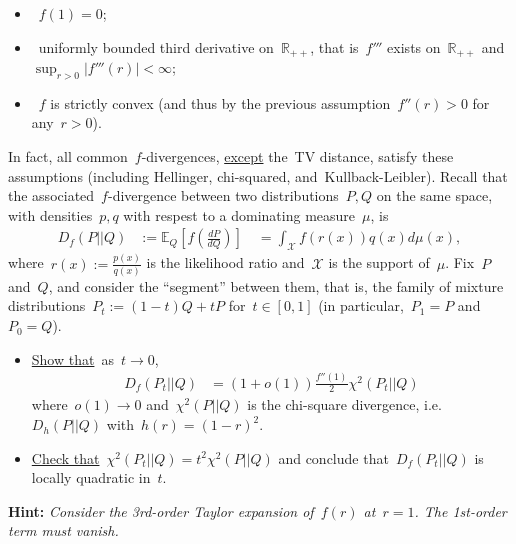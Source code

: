 \documentclass[11pt]{article}
\newcommand{\R}{\mathds{R}}
\newcommand{\E}{\mathds{E}}
\newcommand{\cX}{\mathcal{X}}
\begin{document}
\begin{itemize}
\item~$f(1) = 0$;
\item~uniformly bounded third derivative on~$\R_{++}$, that is~$f'''$ exists on~$\R_{++}$ and~$\sup_{r > 0} |f'''(r)| < \infty$; 
\item~$f$ is strictly convex (and thus by the previous assumption~$f''(r) > 0$ for any~$r > 0$).
\end{itemize}
In fact, all common~$f$-divergences, \underline{except} the~TV distance, satisfy these assumptions (including Hellinger, chi-squared, and~Kullback-Leibler).
Recall that the associated~$f$-divergence between two distributions~$P,Q$ on the same space, with densities~$p,q$ with respest to a dominating measure~$\mu$, is
\[
\begin{aligned}
D_f(P||Q) 
&:= \E_{Q} \left[ f\left( \frac{d P}{d Q} \right) \right] 
\quad = \int_{\cX} f\left( r(x) \right) q(x) d \mu(x),
\end{aligned}
\]
where~$r(x) := \frac{p(x)}{q(x)}$ is the likelihood ratio and~$\cX$ is the support of~$\mu$.
Fix~$P$ and~$Q$, and consider the ``segment'' between them, that is, the family of mixture distributions~$P_t := (1-t)Q + tP$ for~$t \in [0,1]$ (in particular,~$P_1 = P$ and~$P_0 = Q$). 

\begin{itemize}
\item
\underline{Show that}~as~$t \to 0$,
\[
\begin{aligned}
D_f(P_t||Q) 
&= (1+o(1)) \frac{f''(1)}{2} \chi^2(P_t||Q)
\end{aligned}
\]
where~$o(1) \to 0$ and~$\chi^2(P||Q)$ is the chi-square divergence, i.e.~$D_{h}(P||Q)$ with~$h(r) = (1-r)^2$.
\item
\underline{Check that}~$\chi^2(P_t||Q) = t^2 \chi^2(P||Q)$ and conclude that~$D_f(P_t||Q)$ is locally quadratic in~$t$.
\end{itemize}

{\bf Hint:} {\em Consider the 3rd-order Taylor expansion of~$f(r)$ at~$r = 1$. The 1st-order term must vanish.}\\
\fi

\newpage


\end{document}
